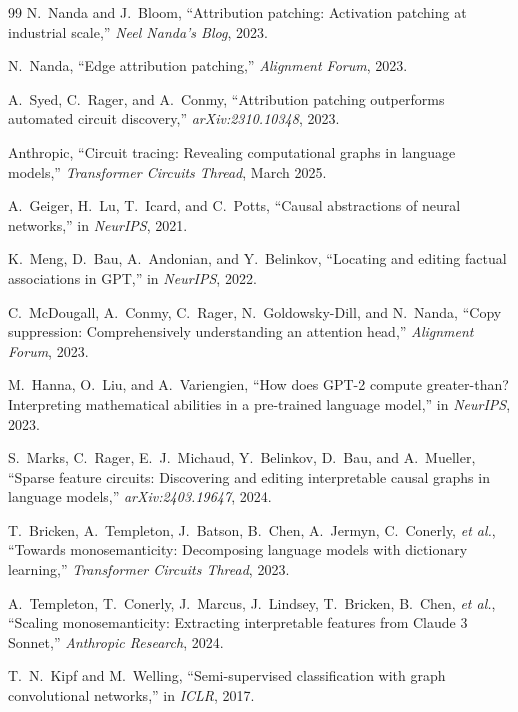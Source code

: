 \documentclass[11pt,a4paper]{article}
\begin{document}
\begin{thebibliography}{99}
N.~Nanda and J.~Bloom,
``Attribution patching: Activation patching at industrial scale,''
\textit{Neel Nanda's Blog}, 2023.

N.~Nanda,
``Edge attribution patching,''
\textit{Alignment Forum}, 2023.

A.~Syed, C.~Rager, and A.~Conmy,
``Attribution patching outperforms automated circuit discovery,''
\textit{arXiv:2310.10348}, 2023.

Anthropic,
``Circuit tracing: Revealing computational graphs in language models,''
\textit{Transformer Circuits Thread}, March 2025.

A.~Geiger, H.~Lu, T.~Icard, and C.~Potts,
``Causal abstractions of neural networks,''
in \textit{NeurIPS}, 2021.

K.~Meng, D.~Bau, A.~Andonian, and Y.~Belinkov,
``Locating and editing factual associations in GPT,''
in \textit{NeurIPS}, 2022.

C.~McDougall, A.~Conmy, C.~Rager, N.~Goldowsky-Dill, and N.~Nanda,
``Copy suppression: Comprehensively understanding an attention head,''
\textit{Alignment Forum}, 2023.

M.~Hanna, O.~Liu, and A.~Variengien,
``How does GPT-2 compute greater-than? Interpreting mathematical abilities in a pre-trained language model,''
in \textit{NeurIPS}, 2023.

S.~Marks, C.~Rager, E.~J.~Michaud, Y.~Belinkov, D.~Bau, and A.~Mueller,
``Sparse feature circuits: Discovering and editing interpretable causal graphs in language models,''
\textit{arXiv:2403.19647}, 2024.

T.~Bricken, A.~Templeton, J.~Batson, B.~Chen, A.~Jermyn, C.~Conerly, \emph{et al.},
``Towards monosemanticity: Decomposing language models with dictionary learning,''
\textit{Transformer Circuits Thread}, 2023.

A.~Templeton, T.~Conerly, J.~Marcus, J.~Lindsey, T.~Bricken, B.~Chen, \emph{et al.},
``Scaling monosemanticity: Extracting interpretable features from Claude 3 Sonnet,''
\textit{Anthropic Research}, 2024.

T.~N.~Kipf and M.~Welling,
``Semi-supervised classification with graph convolutional networks,''
in \textit{ICLR}, 2017.


\end{thebibliography}
\end{document}
